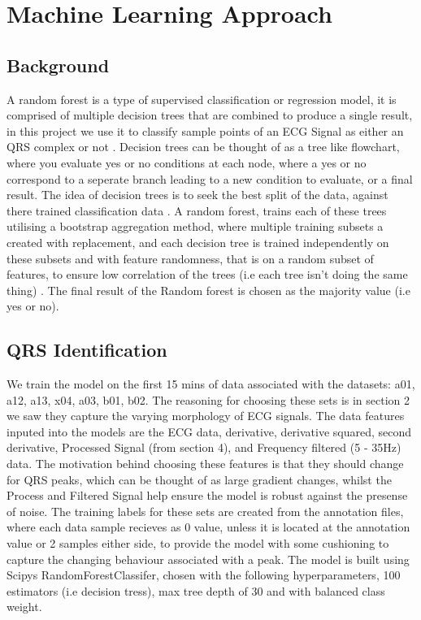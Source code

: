 \chapter{Machine Learning Approach}
\section{Background}
A random forest is a type of supervised classification or regression model, it is comprised of multiple decision trees 
that are combined to produce a single result, in this project we use it to classify sample points of an ECG 
Signal as either an QRS complex or not \cite{Kavlakoglu2021}. Decision trees can be thought of as a tree like flowchart, 
where you evaluate yes or no conditions at each node, where a yes or no correspond to a seperate branch leading to 
a new condition to evaluate, or a final result. The idea of decision trees is to seek the best split of the data, against
there trained classification data \cite{Kavlakoglu2021}. A random forest, trains each of these trees utilising a 
bootstrap aggregation method, where multiple training subsets a created with replacement, and each decision tree is 
trained independently on these subsets and with feature randomness, that is on a random subset of features, to ensure low correlation of the trees (i.e each tree 
isn't doing the same thing) \cite{Kavlakoglu2021}. The final result of the Random forest is chosen as the majority 
value (i.e yes or no). 

\section{QRS Identification}
We train the model on the first 15 mins of data associated with the datasets: a01, a12, a13, x04, a03, b01, b02. 
The reasoning for choosing these sets is in section 2 we saw they capture the varying morphology of ECG signals. 
The data features inputed into the models are the ECG data, derivative, derivative squared, second derivative, 
Processed Signal (from section 4), and Frequency filtered (5 - 35Hz) data. The motivation behind choosing 
these features is that they should change for QRS peaks, which can be thought of as large gradient changes, 
whilst the Process and Filtered Signal help ensure the model is robust against the presense of noise. The training 
labels for these sets are created from the annotation files, where each data sample recieves as 0 value, unless 
it is located at the annotation value or 2 samples either side, to provide the model with some cushioning to capture 
the changing behaviour associated with a peak. The model is built using Scipys RandomForestClassifer, 
chosen with the following hyperparameters, 100 estimators (i.e decision tress), max tree depth of 30
and with balanced class weight. \\

